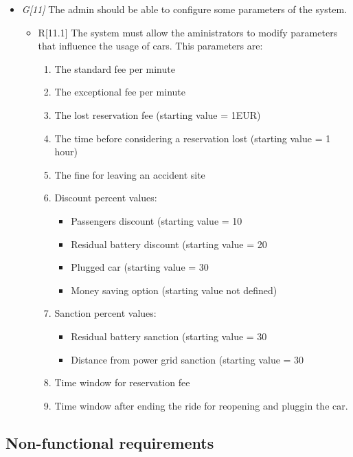 \begin{itemize}
				\item \textit{G[11]} The admin should be able to configure some parameters of the system.
					\begin{itemize}
						\item R[11.1] The system must allow the aministrators to modify parameters that influence the usage of cars. This parameters are:
							\begin{enumerate}
								\item The standard fee per minute
								\item The exceptional fee per minute
								\item The lost reservation fee (starting value = 1EUR)
								\item The time before considering a reservation lost (starting value = 1 hour)
								\item The fine for leaving an accident site %
								\item Discount percent values:
									\begin{itemize}
										\item Passengers discount (starting value = 10%
										\item Residual battery discount (starting value = 20%
										\item Plugged car (starting value = 30%
										\item Money saving option (starting value not defined)
									\end{itemize}
								\item Sanction percent values:
									\begin{itemize}
										\item Residual battery sanction (starting value = 30%
										\item Distance from power grid sanction (starting value = 30%
									\end{itemize}
								\item Time window for reservation fee
								\item Time window after ending the ride for reopening and pluggin the car.
							\end{enumerate}
					\end{itemize}
\end{itemize}





\subsection{Non-functional requirements}

